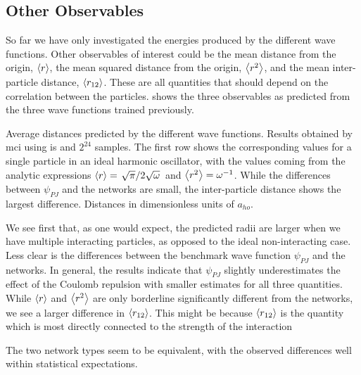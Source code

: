 \documentclass[Thesis.tex]{subfiles}
\begin{document}
\subsection{Other Observables}

So far we have only investigated the energies produced by the different wave
functions. Other observables of interest could be the mean distance from the origin,
$\expval{r}$, the mean squared distance from the origin, $\expval{r^2}$, and the mean
inter-particle distance, $\expval{r_{12}}$. These are all quantities that should
depend on the correlation between the particles.
 shows the three observables as predicted
from the three wave functions trained previously.

\begin{table}[h]
  \centering
  \caption[Radial metrics of different wave functions on quantum dots]{Average distances predicted by the different wave functions. Results
    obtained by \gls{mci} using \gls{is} and $2^{24}$
    samples. The first row shows the corresponding values for a single particle
    in an ideal harmonic oscillator, with the values coming from the analytic
    expressions $\expval{r}=\flatfrac{\sqrt\pi}{2\sqrt\omega}$ and
    $\expval{r^2}=\omega^{-1}$. While the differences between $\psi_{PJ}$ and
    the networks are small, the inter-particle distance shows the largest
    difference. Distances in dimensionless units of $a_{ho}$.}
  
  \label{tab:QD-mean-distance-metrics}
\end{table}
We see first that, as one would expect, the predicted radii are larger when we
have multiple interacting particles, as opposed to the ideal non-interacting
case. Less clear is the differences between the benchmark wave function
$\psi_{PJ}$ and the networks. In general, the results
indicate that $\psi_{PJ}$ slightly underestimates the effect of the Coulomb
repulsion with smaller estimates for all three quantities. While $\expval{r}$
and $\expval{r^2}$ are only borderline significantly different from the networks, we see a
larger difference in $\expval{r_{12}}$. This might
be because $\expval{r_{12}}$ is the quantity which is most directly
connected to the strength of the interaction

The two network types seem to be equivalent, with the observed differences well
within statistical expectations.
\end{document}
